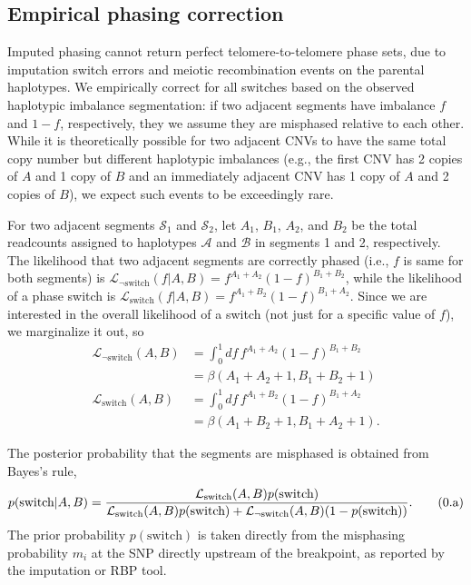 \documentclass[10pt,letter]{article}
\numberwithin{equation}{section}
\newcommand{\btag}[1]{\addtocounter{equation}{1}\label{#1}\tag{\arabic{section}.\alph{equation}}}
\begin{document}
\subsection{Empirical phasing correction}

Imputed phasing cannot return perfect telomere-to-telomere phase sets, due to imputation switch errors and meiotic recombination events on the parental haplotypes. We empirically correct for all switches based on the observed haplotypic imbalance segmentation: if two adjacent segments have imbalance $f$ and $1-f$, respectively, they we assume they are misphased relative to each other. While it is theoretically possible for two adjacent CNVs to have the same total copy number but different haplotypic imbalances (e.g., the first CNV has 2 copies of $A$ and 1 copy of $B$ and an immediately adjacent CNV has 1 copy of $A$ and 2 copies of $B$), we expect such events to be exceedingly rare.

For two adjacent segments $\mathcal{S}_1$ and $\mathcal{S}_2$, let $A_1$, $B_1$, $A_2$, and $B_2$ be the total readcounts assigned to haplotypes $\mathcal A$ and $\mathcal B$ in segments 1 and 2, respectively. The likelihood that two adjacent segments are correctly phased (i.e., $f$ is same for both segments) is $\mathcal{L}_{\neg\text{switch}}(f|A,B)=f^{A_1+A_2}(1-f)^{B_1+B_2}$, while the likelihood of a phase switch is $\mathcal{L}_{\text{switch}}(f|A,B)=f^{A_1 + B_2}(1-f)^{B_1+A_2}$. Since we are interested in the overall likelihood of a switch (not just for a specific value of $f$), we marginalize it out, so
\begin{align*}
\mathcal{L}_{\neg\text{switch}}(A,B)&=\int_0^1 df\,f^{A_1+A_2}(1-f)^{B_1+B_2}\\
&=\beta(A_1+A_2+1,B_1+B_2+1)\\
\mathcal{L}_{\text{switch}}(A,B)&=\int_0^1 df\, f^{A_1 + B_2}(1-f)^{B_1+A_2}\\
&=\beta(A_1+B_2+1,B_1+A_2+1).
\end{align*}

The posterior probability that the segments are misphased is obtained from Bayes's rule,
\begin{align*}
p(\text{switch}|A,B) = \frac{\mathcal{L}_{\text{switch}}(A,B)p(\text{switch})}{\mathcal{L}_{\text{switch}}(A,B)p(\text{switch})+\mathcal{L}_{\neg\text{switch}}(A,B)(1-p(\text{switch}))}.\btag{pswitch}
\end{align*}
The prior probability $p(\text{switch})$ is taken directly from the misphasing probability $m_i$ at the SNP directly upstream of the breakpoint, as reported by the imputation or RBP tool.
\end{document}
